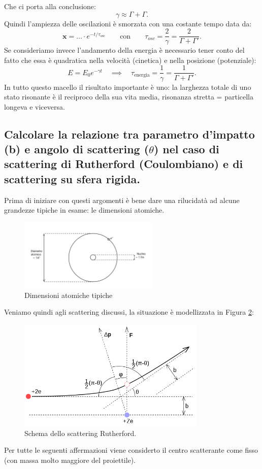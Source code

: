 Che ci porta alla conclusione:
\[
\gamma \approx \Gamma + \Gamma 
.\]
Quindi l'ampiezza delle oscilazioni è smorzata con una costante tempo data da:
\[
	\boldsymbol{x} = \ldots \cdot e^{- t /\tau_{\text{osc}}} \quad \quad \text{con} \quad \quad
\tau_{osc} = \frac{2}{\gamma} = \frac{2}{\Gamma + \Gamma'}
.\]
Se consideriamo invece l'andamento della energia è necessario tener conto del fatto che essa è quadratica nella velocità (cinetica) e nella posizione (potenziale): 
\[
E = E_0 e^{- \gamma t} \quad \implies \quad \tau_{\text{energia}} = \frac{1}{\gamma} = \frac{1}{\Gamma + \Gamma'}
.\]
In tutto questo macello il risultato importante è uno: la larghezza totale di uno stato risonante è il reciproco della sua vita media, risonanza stretta = particella longeva e viceversa.

\subsection[]{Calcolare la relazione tra parametro d'impatto (b) e angolo di scattering ($\theta$) nel caso di scattering di Rutherford (Coulombiano) e di scattering su sfera rigida.} 
\label{sec:2.b.20}
Prima di iniziare con questi argomenti è bene dare una rilucidatà ad alcune grandezze tipiche in esame: le dimensioni atomiche.
\begin{figure}[H]
	\centering
	\includegraphics[width=0.6\textwidth]{immagini/dim-atomo.png}
	\caption{Dimensioni atomiche tipiche}
	\label{fig:atomo}
\end{figure}
Veniamo quindi agli scattering discussi, la situazione è modellizzata in Figura \ref{fig:rutherford}:
\begin{figure}[H]
	\centering
	\includegraphics[width=0.8\textwidth]{immagini/rutherford.png}
	\caption{Schema dello scattering Rutherford.}
	\label{fig:rutherford}
\end{figure}
Per tutte le seguenti affermazioni viene considerto il centro scatterante come fisso (con massa molto maggiore del proiettile).
